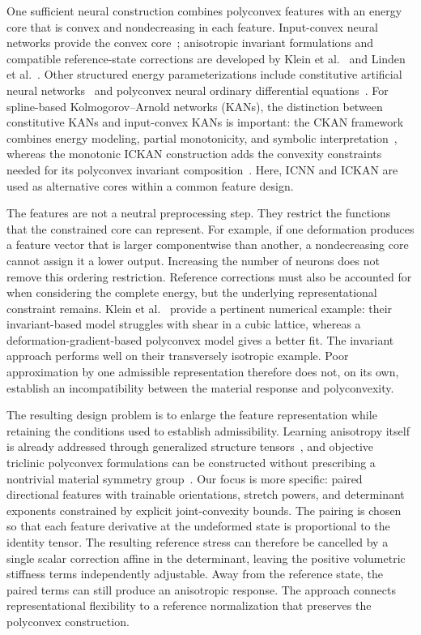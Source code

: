 One sufficient neural construction combines polyconvex features with an energy core that is convex and nondecreasing in each feature. Input-convex neural networks provide the convex core~\cite{amos2017}; anisotropic invariant formulations and compatible reference-state corrections are developed by Klein et al.~\cite{klein2022} and Linden et al.~\cite{linden2023}. Other structured energy parameterizations include constitutive artificial neural networks~\cite{Linka2023} and polyconvex neural ordinary differential equations~\cite{Tac2022}. For spline-based Kolmogorov--Arnold networks (KANs), the distinction between constitutive KANs and input-convex KANs is important: the CKAN framework combines energy modeling, partial monotonicity, and symbolic interpretation~\cite{Abdolazizi2025}, whereas the monotonic ICKAN construction adds the convexity constraints needed for its polyconvex invariant composition~\cite{thakolkaran2025}. Here, ICNN and ICKAN are used as alternative cores within a common feature design.

The features are not a neutral preprocessing step. They restrict the functions that the constrained core can represent. For example, if one deformation produces a feature vector that is larger componentwise than another, a nondecreasing core cannot assign it a lower output. Increasing the number of neurons does not remove this ordering restriction. Reference corrections must also be accounted for when considering the complete energy, but the underlying representational constraint remains. Klein et al.~\cite{klein2022} provide a pertinent numerical example: their invariant-based model struggles with shear in a cubic lattice, whereas a deformation-gradient-based polyconvex model gives a better fit. The invariant approach performs well on their transversely isotropic example. Poor approximation by one admissible representation therefore does not, on its own, establish an incompatibility between the material response and polyconvexity.

The resulting design problem is to enlarge the feature representation while retaining the conditions used to establish admissibility. Learning anisotropy itself is already addressed through generalized structure tensors~\cite{Kalina2024}, and objective triclinic polyconvex formulations can be constructed without prescribing a nontrivial material symmetry group~\cite{klein2026}. Our focus is more specific: paired directional features with trainable orientations, stretch powers, and determinant exponents constrained by explicit joint-convexity bounds. The pairing is chosen so that each feature derivative at the undeformed state is proportional to the identity tensor. The resulting reference stress can therefore be cancelled by a single scalar correction affine in the determinant, leaving the positive volumetric stiffness terms independently adjustable. Away from the reference state, the paired terms can still produce an anisotropic response. The approach connects representational flexibility to a reference normalization that preserves the polyconvex construction.

